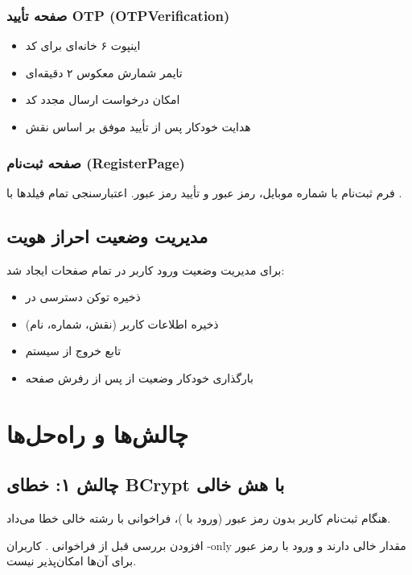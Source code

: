 \documentclass[12pt, a4paper]{article}
\begin{document}
\subsubsection{صفحه تأیید OTP (OTPVerification)}
\begin{itemize}[rightmargin=0.5cm]
  \item اینپوت ۶ خانه‌ای برای کد 
  \item تایمر شمارش معکوس ۲ دقیقه‌ای
  \item امکان درخواست ارسال مجدد کد
  \item هدایت خودکار پس از تأیید موفق بر اساس نقش
\end{itemize}

\subsubsection{صفحه ثبت‌نام (RegisterPage)}
فرم ثبت‌نام با شماره موبایل، رمز عبور و تأیید رمز عبور. اعتبارسنجی تمام فیلدها
با .

\subsection{مدیریت وضعیت احراز هویت}

 برای مدیریت وضعیت ورود کاربر در تمام صفحات ایجاد شد:

\begin{itemize}[rightmargin=0.5cm]
  \item ذخیره توکن دسترسی در 
  \item ذخیره اطلاعات کاربر (نقش، شماره، نام)
  \item تابع خروج از سیستم
  \item بارگذاری خودکار وضعیت از  پس از رفرش صفحه
\end{itemize}

\newpage

\section{چالش‌ها و راه‌حل‌ها}

\subsection{چالش ۱: خطای BCrypt با هش خالی}
\begin{description}[rightmargin=0.5cm]
  \item[مشکل:] هنگام ثبت‌نام کاربر بدون رمز عبور (ورود با )، فراخوانی
     با رشته خالی خطا می‌داد.
  \item[راه‌حل:] افزودن بررسی \texttt{} قبل از
    فراخوانی . کاربران -only مقدار  خالی دارند و
    ورود با رمز عبور برای آن‌ها امکان‌پذیر نیست.
\end{description}
\end{document}
